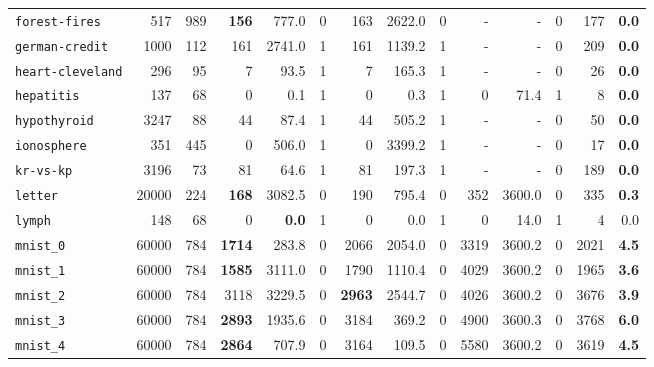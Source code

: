 \begin{tabular}{lccrrrrrrrrrrr}
\texttt{forest-fires} & \multicolumn{1}{r}{517} & \multicolumn{1}{r}{989}  & \textbf{156} & 777.0 & 0 & 163 & 2622.0 & 0 & - & - & 0 & 177 & \textbf{0.0}\\
\texttt{german-credit} & \multicolumn{1}{r}{1000} & \multicolumn{1}{r}{112}  & 161 & 2741.0 & 1 & 161 & 1139.2 & 1 & - & - & 0 & 209 & \textbf{0.0}\\
\texttt{heart-cleveland} & \multicolumn{1}{r}{296} & \multicolumn{1}{r}{95}  & 7 & 93.5 & 1 & 7 & 165.3 & 1 & - & - & 0 & 26 & \textbf{0.0}\\
\texttt{hepatitis} & \multicolumn{1}{r}{137} & \multicolumn{1}{r}{68}  & 0 & 0.1 & 1 & 0 & 0.3 & 1 & 0 & 71.4 & 1 & 8 & \textbf{0.0}\\
\texttt{hypothyroid} & \multicolumn{1}{r}{3247} & \multicolumn{1}{r}{88}  & 44 & 87.4 & 1 & 44 & 505.2 & 1 & - & - & 0 & 50 & \textbf{0.0}\\
\texttt{ionosphere} & \multicolumn{1}{r}{351} & \multicolumn{1}{r}{445}  & 0 & 506.0 & 1 & 0 & 3399.2 & 1 & - & - & 0 & 17 & \textbf{0.0}\\
\texttt{kr-vs-kp} & \multicolumn{1}{r}{3196} & \multicolumn{1}{r}{73}  & 81 & 64.6 & 1 & 81 & 197.3 & 1 & - & - & 0 & 189 & \textbf{0.0}\\
\texttt{letter} & \multicolumn{1}{r}{20000} & \multicolumn{1}{r}{224}  & \textbf{168} & 3082.5 & 0 & 190 & 795.4 & 0 & 352 & 3600.0 & 0 & 335 & \textbf{0.3}\\
\texttt{lymph} & \multicolumn{1}{r}{148} & \multicolumn{1}{r}{68}  & 0 & \textbf{0.0} & 1 & 0 & 0.0 & 1 & 0 & 14.0 & 1 & 4 & 0.0\\
\texttt{mnist\_0} & \multicolumn{1}{r}{60000} & \multicolumn{1}{r}{784}  & \textbf{1714} & 283.8 & 0 & 2066 & 2054.0 & 0 & 3319 & 3600.2 & 0 & 2021 & \textbf{4.5}\\
\texttt{mnist\_1} & \multicolumn{1}{r}{60000} & \multicolumn{1}{r}{784}  & \textbf{1585} & 3111.0 & 0 & 1790 & 1110.4 & 0 & 4029 & 3600.2 & 0 & 1965 & \textbf{3.6}\\
\texttt{mnist\_2} & \multicolumn{1}{r}{60000} & \multicolumn{1}{r}{784}  & 3118 & 3229.5 & 0 & \textbf{2963} & 2544.7 & 0 & 4026 & 3600.2 & 0 & 3676 & \textbf{3.9}\\
\texttt{mnist\_3} & \multicolumn{1}{r}{60000} & \multicolumn{1}{r}{784}  & \textbf{2893} & 1935.6 & 0 & 3184 & 369.2 & 0 & 4900 & 3600.3 & 0 & 3768 & \textbf{6.0}\\
\texttt{mnist\_4} & \multicolumn{1}{r}{60000} & \multicolumn{1}{r}{784}  & \textbf{2864} & 707.9 & 0 & 3164 & 109.5 & 0 & 5580 & 3600.2 & 0 & 3619 & \textbf{4.5}\\

\end{tabular}
